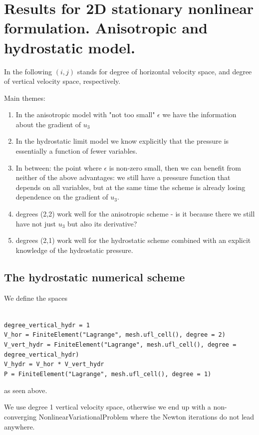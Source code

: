 \documentclass[11pt]{article}
\begin{document}
\section{Results for 2D stationary nonlinear formulation. Anisotropic and hydrostatic model.}

In the following $(i,j)$ stands for degree of horizontal velocity space, and degree of vertical velocity space, respectively.

Main themes:
\begin{enumerate}
  \item In the anisotropic model with "not too small" $\epsilon$ we have the information about the gradient of $u_3$
  \item In the hydrostatic limit model we know explicitly that the pressure is essentially a function of fewer variables.
  \item In between: the point where $\epsilon$ is non-zero small, then we can benefit from neither of the above advantages: we still have a pressure function that depends on all variables, but at the same time the scheme is already losing dependence on the gradient of $u_3.$
  \item degrees (2,2) work well for the anisotropic scheme - is it because there we still have not just $u_3$ but also its derivative?
  \item degrees (2,1) work well for the hydrostatic scheme combined with an explicit knowledge of the hydrostatic pressure.
\end{enumerate}

\subsection{The hydrostatic numerical scheme}

We define the spaces

\texttt{
\\
degree\_vertical\_hydr = 1 \\
V\_hor = FiniteElement("Lagrange", mesh.ufl\_cell(), degree = 2) \\
V\_vert\_hydr = FiniteElement("Lagrange", mesh.ufl\_cell(), degree = degree\_vertical\_hydr) \\
V\_hydr = V\_hor * V\_vert\_hydr\\
P = FiniteElement("Lagrange", mesh.ufl\_cell(), degree = 1)\\
}

as seen above.

We use degree 1 vertical velocity space, otherwise we end up with a non-converging NonlinearVariationalProblem where the Newton iterations do not lead anywhere.
\end{document}
